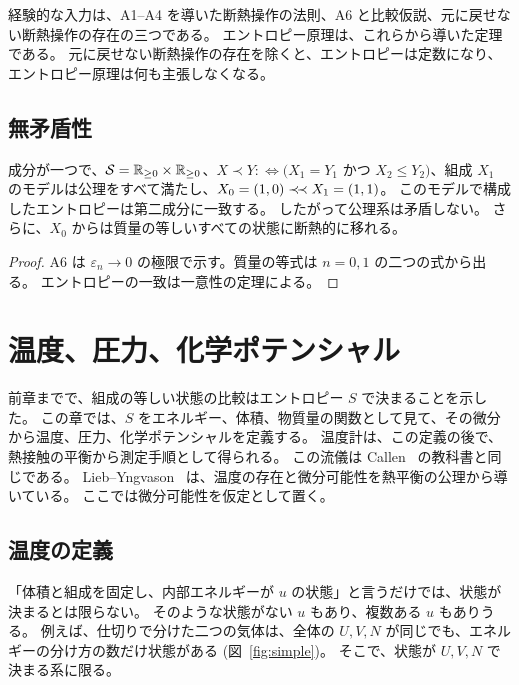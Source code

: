 経験的な入力は、A1--A4 を導いた断熱操作の法則、A6 と比較仮説、元に戻せない断熱操作の存在の三つである。
エントロピー原理は、これらから導いた定理である。
元に戻せない断熱操作の存在を除くと、エントロピーは定数になり、エントロピー原理は何も主張しなくなる。

\section{無矛盾性}

\begin{theorem}[モデルの存在]
  \label{thm:model}
  \leanok
  成分が一つで、$\mathcal{S} = \mathbb{R}_{\ge 0} \times \mathbb{R}_{\ge 0}$、$X \prec Y :\iff (X_1 = Y_1$ かつ $X_2 \le Y_2)$、組成 $X_1$ のモデルは公理をすべて満たし、$X_0 = (1, 0) \mathrel{\prec\!\prec} X_1 = (1, 1)$。
  このモデルで構成したエントロピーは第二成分に一致する。
  したがって公理系は矛盾しない。
  さらに、$X_0$ からは質量の等しいすべての状態に断熱的に移れる。
\end{theorem}

\begin{proof}
  \leanok
  A6 は $\varepsilon_n \to 0$ の極限で示す。質量の等式は $n = 0, 1$ の二つの式から出る。
  エントロピーの一致は一意性の定理による。
\end{proof}

\chapter{温度、圧力、化学ポテンシャル}

前章までで、組成の等しい状態の比較はエントロピー $S$ で決まることを示した。
この章では、$S$ をエネルギー、体積、物質量の関数として見て、その微分から温度、圧力、化学ポテンシャルを定義する。
温度計は、この定義の後で、熱接触の平衡から測定手順として得られる。
この流儀は Callen~\cite{Callen1985} の教科書と同じである。
Lieb--Yngvason~\cite[第 5 章]{LY99} は、温度の存在と微分可能性を熱平衡の公理から導いている。
ここでは微分可能性を仮定として置く。

\section{温度の定義}

「体積と組成を固定し、内部エネルギーが $u$ の状態」と言うだけでは、状態が決まるとは限らない。
そのような状態がない $u$ もあり、複数ある $u$ もありうる。
例えば、仕切りで分けた二つの気体は、全体の $U, V, N$ が同じでも、エネルギーの分け方の数だけ状態がある (図~\ref{fig:simple})。
そこで、状態が $U, V, N$ で決まる系に限る。

